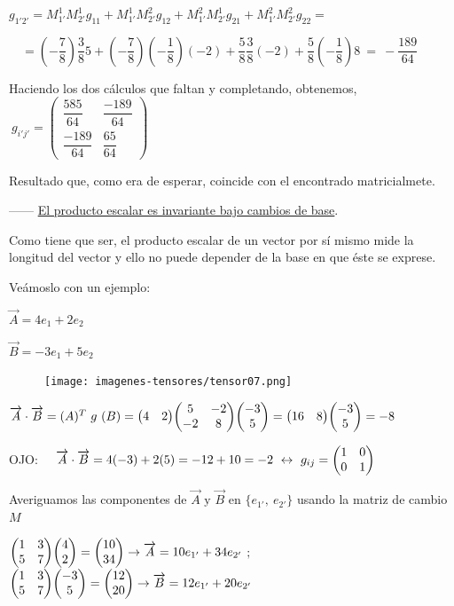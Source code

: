 $g_{1'2'}=
M^1_{1'}M^1_{2'}g_{11}+M^1_{1'}M^2_{2'}g_{12}+M^2_{1'}M^1_{2'}g_{21}+M^2_{1'}M^2_{2'}g_{22}=$

$\quad = \left( - \dfrac 7 8 \right) \dfrac 3 8 5 + \left( -\dfrac 7 8 \right) \left(-\dfrac 1 8 \right) (-2) + \dfrac 5 8 \dfrac 3 8 (-2) + \dfrac 5 8 \left( - \dfrac 1 8  \right) 8 \  = \  -\dfrac{189}{64}$

Haciendo los dos cálculos que faltan y completando, obtenemos, $\ g_{i'j'}=\left( \begin{matrix} \dfrac{585}{64}&\dfrac{-189}{64}\\\dfrac{-189}{64}&\dfrac{65}{64} \end{matrix} \right)$

Resultado que, como era de esperar, coincide con el encontrado matricialmete.

------ \underline{El producto escalar es invariante bajo cambios de base}. 

\begin{multicols}{2}
\textcolor{gris}{Como tiene que ser, el producto escalar de un vector por sí mismo mide la longitud del vector y ello no puede depender de la base en que éste se exprese.}

Veámoslo con un ejemplo: 

$\overrightarrow A=4e_1+2e_2$

$\overrightarrow B=-3e_1+5e_2$

\begin{figure}[H]
		\centering
		\texttt{[image: imagenes-tensores/tensor07.png]}
	\end{figure}
\end{multicols}


	
$\overrightarrow A\cdot \overrightarrow B=(A)^T\ g \ (B)=\mqty(4&2) \mqty(5&-2\\-2&8) \mqty(-3\\5) =\mqty(16&8) \mqty(-3\\5)=-8$

\textcolor{gris}{OJO: $\quad \overrightarrow A\cdot \overrightarrow B=4(-3)+2(5)=-12+10=-2 \ \leftrightarrow \ g_{ij}= \mqty(1&0\\0&1)$ }

Averiguamos las componentes de $\overrightarrow A \text{ y } \overrightarrow B$ en $\{e_{1'},\ e_{2'}\}$ usando la matriz de cambio $M$

$\mqty(1&3\\5&7) \mqty(4\\2) = \mqty(10\\34) \to \overrightarrow A=10e_{1'}+34e_{2'}$
$;\qquad$
$\mqty(1&3\\5&7) \mqty(-3\\5) = \mqty(12\\20) \to \overrightarrow B=12e_{1'}+20e_{2'}$

